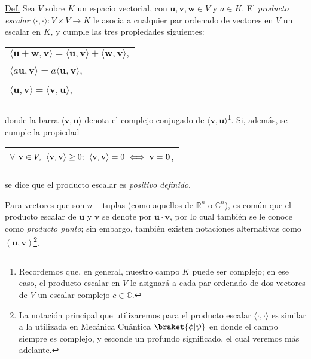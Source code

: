 \documentclass[notasLineal]{subfile}
\begin{document}
\begin{tcolorbox}
\underline{Def.} Sea $V$ sobre $K$ un espacio vectorial, con $\mathbf{u},\mathbf{v},\mathbf{w}\in V$ y $a\in K$. El \textit{producto escalar} $\langle\cdot\mathop ,\cdot\rangle:V\times V\rightarrow K$ le asocia a cualquier par ordenado de vectores en $V$ un escalar en $K$, y cumple las tres propiedades siguientes:

\begin{tabular}{l}
    \\
    $\langle\mathbf{u}+\mathbf{w},\mathbf{v}\rangle = \langle\mathbf{u},\mathbf{v}\rangle+\langle\mathbf{w},\mathbf{v}\rangle,$ \\ \\ $\langle a\mathbf{u},\mathbf{v}\rangle = a\langle\mathbf{u},\mathbf{v}\rangle,$ \\ \\
    $\langle\mathbf{u},\mathbf{v}\rangle=\overline{\langle\mathbf{v},\mathbf{u}\rangle},$ \\ \\
\end{tabular}

donde la barra $\overline{\langle\mathbf{v},\mathbf{u}\rangle}$ denota el complejo conjugado de $\langle\mathbf{v},\mathbf{u}\rangle$\footnote{Recordemos que, en general, nuestro campo $K$ puede ser complejo; en ese caso, el producto escalar en $V$ le asignará a cada par ordenado de dos vectores de $V$ un escalar complejo $c\in\mathbb{C}$.}. Si, además, se cumple la propiedad

\begin{tabular}{l}
    \\
    $\forall\hspace{1.5mm}\mathbf{v}\in V, \hspace{1.5mm} \langle\mathbf{v},\mathbf{v}\rangle\geq0; \hspace{1.5mm} \langle\mathbf{v},\mathbf{v}\rangle = 0 \iff \mathbf{v}=\mathbf{0}$, \\ \\
\end{tabular}

se dice que el producto escalar es \textit{positivo definido}.

\vspace{3mm}
\hspace{2.5mm} Para vectores que son $n-$tuplas (como aquellos de $\mathbb{R}^n$ o $\mathbb{C}^n$), es común que el producto escalar de $\mathbf{u}$ y $\mathbf{v}$ se denote por $\mathbf{u}\cdot\mathbf{v}$, por lo cual también se le conoce como \textit{producto punto}; sin embargo, también existen notaciones alternativas como $(\mathbf{u}, \mathbf{v})$\footnote{La notación principal que utilizaremos para el producto escalar $\langle \cdot,\cdot\rangle$ es similar a la utilizada en Mecánica Cuántica $\braket{\phi|\psi}$ \textemdash en donde el campo siempre es complejo\textemdash, y esconde un profundo significado, el cual veremos más adelante.}.

\end{tcolorbox}{}
\end{document}
